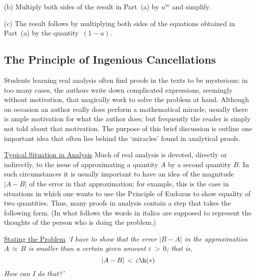 \V

        (b) Multiply both sides of the result in Part~(a) by $u^{m}$ and simplify.


\V

        (c) The result follows by multiplying both sides of the equations obtained in Part~(a) by the quantity~$(1-u)$.

\VV

        \subsection{\small{The Principle of Ingenious Cancellations}}
        \label{RemrkB25.85}



        Students learning real analysis often find proofs in the texts to be mysterious;
    in too many cases, the authors write down complicated expressions, seemingly without motivation, that magically work to solve the problem at hand.
    Although on occasion an author really does perform a mathematical miracle, usually there is ample motivation for what the author does;
    but frequently the reader is simply not told about that motivation.
    The purpose of this brief discussion is outline one important idea that often lies behind the `miracles' found in analytical proofs.

        \underline{Typical Situation in Analysis}
    Much of real analysis is devoted, directly or indirectly, to the issue of approximating a quantity $A$ by a second quantity $B$.
    In such circumstances it is usually important to have an idea of the magnitude $|A-B|$ of the error in that approximation;
    for example, this is the case in situations in which one wants to use the Principle of Eudoxus to show equality of two quantities.
    Thus, many proofs in analysis contain a step that takes the following form.
    (In what follows the words in italics are supposed to represent the thoughts of the person who is doing the problem.)

\V


       \h \underline{Stating the Problem} {\em `I have to show that the error $|B-A|$ in the approximation $A\, {\approx}\,B$ is smaller than a certain given amount ${\varepsilon}\,>\,0$; that is,
        \begin{displaymath}
        |A-B|\,<\,{\varepsilon} \h ({\ast})
        \end{displaymath}
    How can I do that?'
    } %

